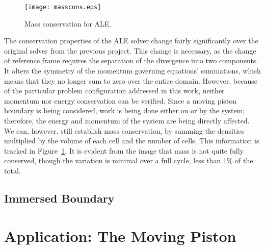 \documentclass{article}
\begin{document}
\begin{figure}
    \centering
    \texttt{[image: masscons.eps]}         
    \caption{Mass conservation for ALE.}
    \label{fig:masscons}
  \end{figure}
The conservation properties of the ALE solver change fairly significantly over the original solver from the previous project.  This change is necessary, as the change of reference frame requires the separation of the divergence into two components.  It alters the symmetry of the momentum governing equations' summations, which means that they no longer sum to zero over the entire domain.  However, because of the particular problem configuration addressed in this work, neither momentum nor energy conservation can be verified.  Since a moving piston boundary is being considered, work is being done either on or by the system; therefore, the energy and momentum of the system are being directly affected.  We can, however, still establish mass conservation, by summing the densities multiplied by the volume of each cell and the number of cells.  This information is tracked in Figure~\ref{fig:masscons}.  It is evident from the image that mass is not quite fully conserved, though the variation is minimal over a full cycle, less than 1\% of the total.  

\subsection{Immersed Boundary}




\section{Application: The Moving Piston}
\end{document}
